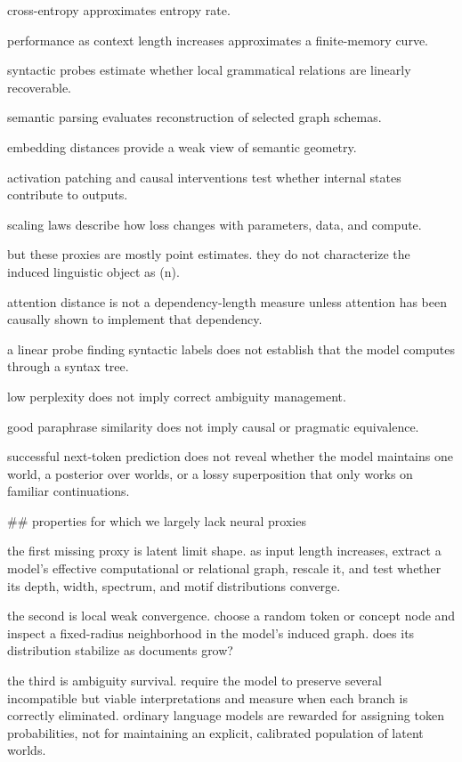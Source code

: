 cross-entropy approximates entropy rate.

performance as context length increases approximates a finite-memory curve.

syntactic probes estimate whether local grammatical relations are linearly recoverable.

semantic parsing evaluates reconstruction of selected graph schemas.

embedding distances provide a weak view of semantic geometry.

activation patching and causal interventions test whether internal states contribute to outputs.

scaling laws describe how loss changes with parameters, data, and compute.

but these proxies are mostly point estimates. they do not characterize the induced linguistic object as (n\to\infty).

attention distance is not a dependency-length measure unless attention has been causally shown to implement that dependency.

a linear probe finding syntactic labels does not establish that the model computes through a syntax tree.

low perplexity does not imply correct ambiguity management.

good paraphrase similarity does not imply causal or pragmatic equivalence.

successful next-token prediction does not reveal whether the model maintains one world, a posterior over worlds, or a lossy superposition that only works on familiar continuations.

## properties for which we largely lack neural proxies

the first missing proxy is latent limit shape. as input length increases, extract a model’s effective computational or relational graph, rescale it, and test whether its depth, width, spectrum, and motif distributions converge.

the second is local weak convergence. choose a random token or concept node and inspect a fixed-radius neighborhood in the model’s induced graph. does its distribution stabilize as documents grow?

the third is ambiguity survival. require the model to preserve several incompatible but viable interpretations and measure when each branch is correctly eliminated. ordinary language models are rewarded for assigning token probabilities, not for maintaining an explicit, calibrated population of latent worlds.

